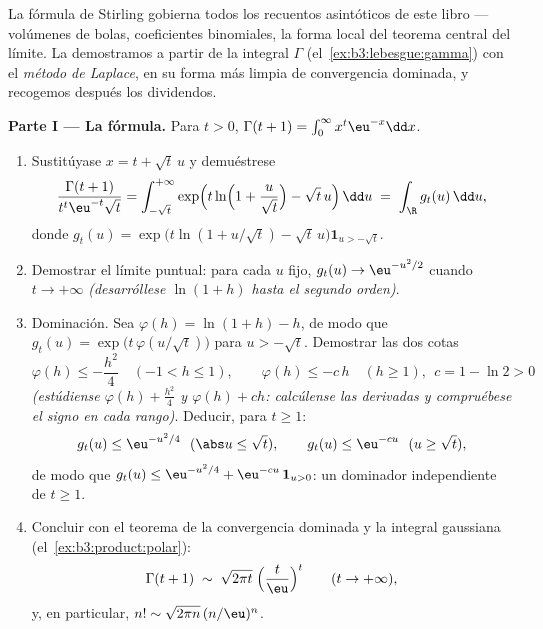 \begin{problem}
\label{pb:b3:product:1}
La fórmula de Stirling gobierna todos los recuentos asintóticos de este
libro --- volúmenes de bolas, coeficientes binomiales, la forma local
del teorema central del límite. La demostramos a partir de la integral
$\Gamma$ (el~\cref{ex:b3:lebesgue:gamma}) con el \emph{método de
Laplace}, en su forma más limpia de convergencia dominada, y recogemos
después los dividendos.

\medskip
\noindent\textbf{Parte I --- La fórmula.} Para $t > 0$,
$\Gamma(t + 1) = \int_0^\infty x^{t}\eu^{-x}\dd x$.
\begin{enumerate}
  \item Sustitúyase $x = t + \sqrt t\,u$ y demuéstrese
        \[
        \frac{\Gamma(t+1)}{t^{t}\eu^{-t}\sqrt t}
        = \int_{-\sqrt t}^{+\infty}
        \exp\Bigl(t\ln\Bigl(1 + \frac u{\sqrt
        t}\Bigr) - \sqrt t\,u\Bigr)\,\dd u
        \;=\;\int_\R g_t(u)\,\dd u,
        \]
        donde $g_t(u) = \exp\bigl(t\ln(1 + u/\sqrt t) -
        \sqrt t\,u\bigr)\mathbf 1_{u > -\sqrt t}$. \item Demostrar el
        límite puntual: para cada $u$ fijo, $g_t(u)
        \to \eu^{-u^2/2}$ cuando $t \to +\infty$ \emph{(desarróllese
        $\ln(1 + h)$ hasta el segundo orden)}. \item Dominación. Sea
        $\varphi(h) = \ln(1 + h) - h$, de modo que
        $g_t(u) = \exp\bigl(t\,\varphi(u/\sqrt t)\bigr)$ para
        $u > -\sqrt t$. Demostrar las dos cotas
        \[
        \varphi(h) \leq -\frac{h^2}4 \quad (-1 < h \leq 1),
        \qquad
        \varphi(h) \leq -c\,h \quad (h \geq 1),\ \ c = 1 -
        \ln 2 > 0
        \]
        \emph{(estúdiense $\varphi(h) + \frac{h^2}4$ y $\varphi(h)
        + ch$: calcúlense las derivadas y compruébese el signo en cada
        rango)}. Deducir, para $t \geq 1$:
        \[
        g_t(u) \leq \eu^{-u^2/4}\ \ (\abs u \leq \sqrt t),
        \qquad
        g_t(u) \leq \eu^{-cu}\ \ (u \geq \sqrt t),
        \]
        de modo que $g_t(u) \leq \eu^{-u^2/4} +
        \eu^{-cu}\,\mathbf 1_{u > 0}$: un dominador
         independiente de
        $t \geq 1$. \item Concluir con el teorema de la convergencia
        dominada y la integral gaussiana
        (el~\cref{ex:b3:product:polar}):
        \[
        \Gamma(t + 1) \;\sim\;
        \sqrt{2\pi t}\;\Bigl(\frac t\eu\Bigr)^{t}
        \qquad (t \to +\infty),
        \]
        y, en particular, $n! \sim \sqrt{2\pi
        n}\,(n/\eu)^n$.
\end{enumerate}


\end{problem}
